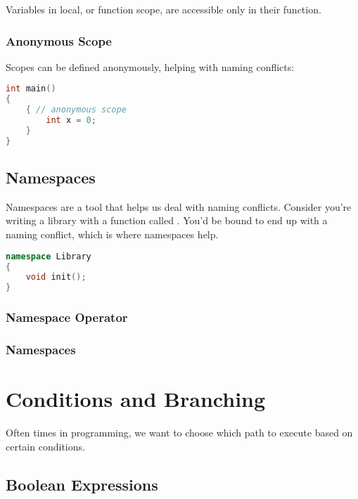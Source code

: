 \documentclass{article}
\begin{document}
Variables in local, or function scope, are accessible only in their function.

\subsubsection{Anonymous Scope}

Scopes can be defined anonymously, helping with naming conflicts:

\begin{lstlisting}[language=C++]
int main()
{
	{ // anonymous scope
 		int x = 0;
	}
}
\end{lstlisting}

\subsection{Namespaces}

\noindent
Namespaces are a tool that helps us deal with naming conflicts. Consider you're writing a library with a function called . You'd be bound to end up with a naming conflict, which is where namespaces help.

\begin{lstlisting}[language=C++]
namespace Library
{
	void init();
}
\end{lstlisting}

\subsubsection{Namespace Operator \inlinecpp{::}}


\subsubsection{ Namespaces}



\section{Conditions and Branching}

\noindent
Often times in programming, we want to choose which path to execute based on certain conditions.

\subsection{Boolean Expressions}
\end{document}
